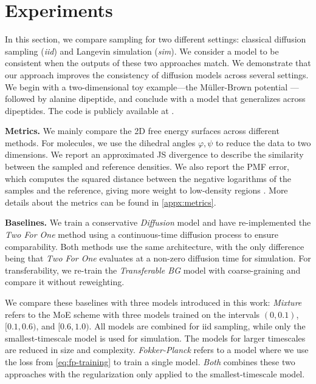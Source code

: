 \section{Experiments} \label{sec:experiments}
In this section, we compare sampling for two different settings: classical diffusion sampling (\emph{iid}) and Langevin simulation (\emph{sim}). We consider a model to be consistent when the outputs of these two approaches match. We demonstrate that our approach improves the consistency of diffusion models across several settings. We begin with a two-dimensional toy example---the Müller-Brown potential \citep{muellerbrown1979}---followed by alanine dipeptide, and conclude with a model that generalizes across dipeptides. The code is publicly available at \ourCode{}.

\textbf{Metrics.} We mainly compare the 2D free energy surfaces across different methods. For molecules, we use the dihedral angles $\varphi, \psi$ to reduce the data to two dimensions. We report an approximated \gls{JS} divergence to describe the similarity between the sampled and reference densities. We also report the \gls{PMF} error, which computes the squared distance between the negative logarithms of the samples and the reference, giving more weight to low-density regions \citep{durumeric2024learning}. More details about the metrics can be found in \cref{appx:metrics}.

\textbf{Baselines.} We train a conservative \emph{Diffusion} model and have re-implemented the \emph{Two For One} method \citep{arts2023} using a continuous-time diffusion process to ensure comparability. Both methods use the same architecture, with the only difference being that \emph{Two For One} evaluates at a non-zero diffusion time for simulation. For transferability, we re-train the \emph{Transferable \gls{BG}} model \citep{klein2024tbg} with coarse-graining and compare it without reweighting.

We compare these baselines with three models introduced in this work:
\emph{Mixture} refers to the \gls{MoE} scheme with three models trained on the intervals $(0, 0.1)$, $[0.1, 0.6)$, and $[0.6, 1.0)$. All models are combined for iid sampling, while only the smallest-timescale model is used for simulation. The models for larger timescales are reduced in size and complexity. \emph{Fokker-Planck} refers to a model where we use the loss from \cref{eq:fp-training} to train a single model. \emph{Both} combines these two approaches with the regularization only applied to the smallest-timescale model.


